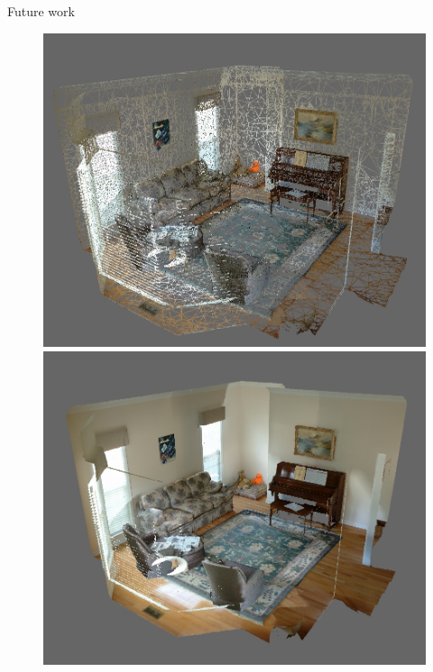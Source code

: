 \begin{frame}{Future work}
\begin{figure}[!tbp]
  \centering
  \begin{minipage}[b]{0.49\textwidth}
    \includegraphics[width=\textwidth]{./images/livingroomwire.jpg}
  \end{minipage}
  \begin{minipage}[b]{0.5\textwidth}
    \includegraphics[width=\textwidth]{./images/backfacingoff.jpg}
  \end{minipage}
\end{figure}

\end{frame}

